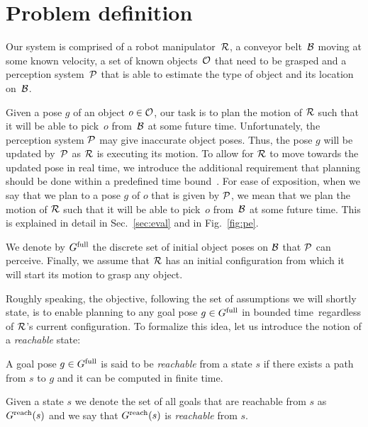 \documentclass[conference]{IEEEtran}
\begin{document}
\section{Problem definition}
Our system is comprised of 
a robot manipulator~$\mathcal{R}$,
a conveyor belt~$\mathcal{B}$ moving at some known velocity,
a set of known objects~$\mathcal{O}$ that need to be grasped and 
a perception system~$\mathcal{P}$ that is able to estimate the type of object and its location on~$\mathcal{B}$.

Given a pose $g$ of an object $o \in \mathcal{O}$, our task is to plan the motion of $\mathcal{R}$ such that it will be able to pick~$o$ from~$\mathcal{B}$ at some future time.
%
Unfortunately, the perception system $\mathcal{P}$ may give inaccurate object poses.
Thus, the pose $g$ will be updated by~$\mathcal{P}$ as $\mathcal{R}$ is executing its motion. 
To allow for $\mathcal{R}$ to move towards the updated pose in real time, we introduce the additional requirement that planning should be done within a predefined time bound~\Tbound.
%
For ease of exposition, when we say that we plan to a pose $g$ of $o$ that is given by $\mathcal{P}$, 
we mean that we plan the motion of $\mathcal{R}$ such that it will be able to pick~$o$ from~$\mathcal{B}$ at some future time. 
This is explained in detail in Sec.~\ref{sec:eval} and in Fig.~\ref{fig:pe}.

%
We denote by $G^{\textrm{full}}$ the discrete set of initial object poses on $\mathcal{B}$ that $\mathcal{P}$ can perceive.
%
Finally, we assume that $\mathcal{R}$ has an initial configuration \Shome from which it will start its motion to grasp any object.


Roughly speaking, the objective, following the set of assumptions we will shortly state, is to enable planning to any goal pose $ g \in G^{\textrm{full}}$ in bounded time~\Tbound regardless of $\mathcal{R}$'s current configuration.
To formalize this idea, let us introduce the notion of a \emph{reachable} state:

\begin{definition}
    A goal pose $g \in G^{\textrm{full}}$ is said to be \emph{reachable} from a state $s$ if there exists a path from $s$ to $g$ and it can be computed in finite time.
\end{definition}

Given a state $s$ we denote the set of all goals that are reachable from $s$ as $G^{\rm reach}(s)$ and we say that $G^{\rm reach}(s)$ is \emph{reachable} from $s$.
\end{document}
